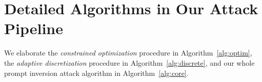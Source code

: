 \section{Detailed Algorithms in Our Attack Pipeline}

We elaborate the \textit{constrained optimization} procedure in Algorithm~\ref{alg:optim}, the \textit{adaptive discretization} procedure in Algorithm~\ref{alg:discrete}, and our whole prompt inversion attack algorithm in Algorithm~\ref{alg:core}.
 
